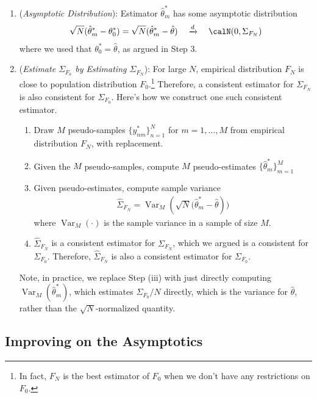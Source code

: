 \documentclass[12pt]{article}
\theoremstyle{plain}
\theoremstyle{definition}
\theoremstyle{remark}
\newcommand{\Var}{\operatorname{Var}}
\newcommand{\dto}{\xrightarrow{d}}
\newcommand{\nN}{_{n=1}^N}
\begin{document}
\begin{enumerate}
  \item
    (\emph{Asymptotic Distribution}):
    Estimator $\hat{\theta}_m^*$ has some asymptotic distribution
    \begin{align*}
      \sqrt{N}(\hat{\theta}_m^*-\theta_0^*)
      =
      \sqrt{N}(\hat{\theta}_m^*-\hat{\theta})
      \quad\dto\quad
      \calN(0,\Sigma_{F_N})
    \end{align*}
    where we used that $\theta_0^*=\hat{\theta}$, as argued in Step 3.

  \item
    (\emph{Estimate $\Sigma_{F_0}$ by Estimating $\Sigma_{F_N}$}):
    For large $N$, empirical distribution $F_N$ is close to population
    distribution $F_0$.\footnote{%
      In fact, $F_N$ is the best estimator of $F_0$ when we don't have
      any restrictions on $F_0$.
    }
    Therefore, a consistent estimator for $\Sigma_{F_N}$ is also
    consistent for $\Sigma_{F_0}$. Here's how we construct one such
    consistent estimator.
    \begin{enumerate}[label=(\roman*)]
      \item Draw $M$ pseudo-samples $\{y_{nm}^*\}\nN$ for $m=1,\ldots,M$
        from empirical distribution $F_N$, with replacement.
      \item Given the $M$ pseudo-samples, compute $M$ pseudo-estimates
        $\{\hat{\theta}_m^*\}_{m=1}^M$
      \item Given pseudo-estimates, compute sample variance
        \begin{align*}
          \hat{\Sigma}_{F_N}
          =\Var_M(\sqrt{N}\big(\hat{\theta}_m^*-\hat{\theta})\big)
        \end{align*}
        where $\Var_M(\cdot)$ is the sample variance in a sample of size
        $M$.
      \item
        $\hat{\Sigma}_{F_N}$ is a consistent estimator for
        $\Sigma_{F_N}$, which we argued is a consistent for
        $\Sigma_{F_0}$.
        Therefore, $\hat{\Sigma}_{F_N}$ is also a consistent estimator
        for $\Sigma_{F_0}$.
    \end{enumerate}
    Note, in practice, we replace Step (iii) with just directly
    computing $\Var_M(\hat{\theta}_m^*)$, which estimates
    $\Sigma_{F_0}/N$ directly, which is the variance for $\hat{\theta}$,
    rather than the $\sqrt{N}$-normalized quantity.
\end{enumerate}

\clearpage
\subsection{Improving on the Asymptotics}
\end{document}
